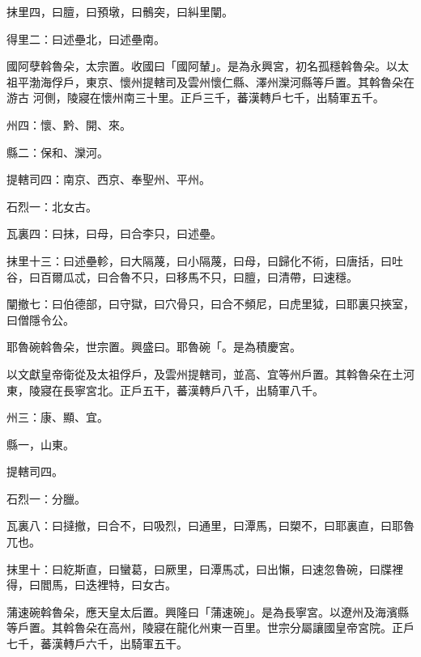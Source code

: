 \begin{pinyinscope}
 抹里四，曰膻，曰預墩，曰鶻突，曰糾里闡。



 得里二：曰述壘北，曰述壘南。



 國阿孽斡魯朵，太宗置。收國曰「國阿輦」。是為永興宮，初名孤穩斡魯朵。以太祖平渤海俘戶，東京、懷州提轄司及雲州懷仁縣、澤州灤河縣等戶置。其斡魯朵在游古
 河側，陵寢在懷州南三十里。正戶三千，蕃漢轉戶七千，出騎軍五千。



 州四：懷、黔、開、來。



 縣二：保和、灤河。



 提轄司四：南京、西京、奉聖州、平州。



 石烈一：北女古。



 瓦裏四：曰抹，曰母，曰合李只，曰述壘。



 抹里十三：曰述壘軫，曰大隔蔑，曰小隔蔑，曰母，曰歸化不術，曰唐括，曰吐谷，曰百爾瓜忒，曰合魯不只，曰移馬不只，曰膻，曰清帶，曰速穩。



 闡撤七：曰伯德部，曰守獄，曰穴骨只，曰合不頻尼，曰虎里狘，曰耶裏只挾室，曰僧隱令公。



 耶魯碗斡魯朵，世宗置。興盛曰。耶魯碗「。是為積慶宮。



 以文獻皇帝衛從及太祖俘戶，及雲州提轄司，並高、宜等州戶置。其斡魯朵在土河東，陵寢在長寧宮北。正戶五干，蕃漢轉戶八千，出騎軍八千。



 州三：康、顯、宜。



 縣一，山東。



 提轄司四。



 石烈一：分臘。



 瓦裏八：曰撻撤，曰合不，曰吸烈，曰通里，曰潭馬，曰槊不，曰耶裏直，曰耶魯兀也。



 抹里十：曰紇斯直，曰蠻葛，曰厥里，曰潭馬忒，曰出懶，曰速忽魯碗，曰牒裡得，曰閻馬，曰迭裡特，曰女古。



 蒲速碗斡魯朵，應天皇太后置。興隆曰「蒲速碗」。是為長寧宮。以遼州及海濱縣等戶置。其斡魯朵在高州，陵寢在龍化州東一百里。世宗分屬讓國皇帝宮院。正戶七千，蕃漢轉戶六千，出騎軍五干。




\end{pinyinscope}
